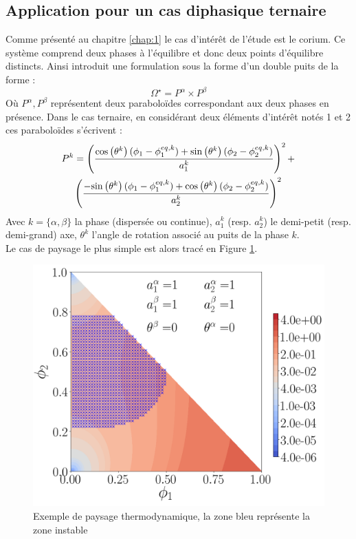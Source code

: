 	\subsection{Application pour un cas diphasique ternaire}
Comme présenté au chapitre \ref{chap:1} le cas d'intérêt de l'étude est le corium. Ce système comprend deux phases à l'équilibre et donc deux points d'équilibre distincts.  Ainsi \cite{rasolofomanana_numerical_nodate} introduit une formulation sous la forme d'un double puits de la forme :
\begin{equation}\label{double_puit}
	\Omega^{\star}  = P^{\alpha} \times P^{\beta}
\end{equation}
Où $P^{\alpha}, P^{\beta}$ représentent deux paraboloïdes correspondant aux deux phases en présence. Dans le cas ternaire, en considérant deux éléments d'intérêt notés 1 et 2 ces paraboloïdes s'écrivent :
\begin{multline}
P^{k}=\left(\frac{\text{cos}\left(\theta^{k}\right)(\phi_{1}-\phi_{1}^{eq,k}) + \text{sin}\left(\theta^{k}\right)(\phi_{2}-\phi_{2}^{eq,k})}{a_{1}^{k}}\right)^{2}+\\ \left(\frac{-\text{sin}\left(\theta^{k}\right)(\phi_{1}-\phi_{1}^{eq,k}) + \text{cos}\left(\theta^{k}\right)(\phi_{2}-\phi_{2}^{eq,k})}{a_{2}^{k}}\right)^{2}
\label{eq:paraboloid_general_}
\end{multline}
Avec $k = \{\alpha,\beta\}$ la phase (dispersée ou continue), $a_{1}^k$ (resp. $a_{2}^k$) le demi-petit  (resp. demi-grand) axe, $\theta^k$ l'angle de rotation associé au puits de la phase $k$.\\
Le cas de paysage le plus simple est alors tracé en Figure \ref{fig:landscape}.
\begin{figure}[H]
	\centering
	\includegraphics[width=0.6\linewidth]{figure/landscape}
	\caption{Exemple de paysage thermodynamique, la zone bleu représente la zone instable}
	\label{fig:landscape}
\end{figure}
